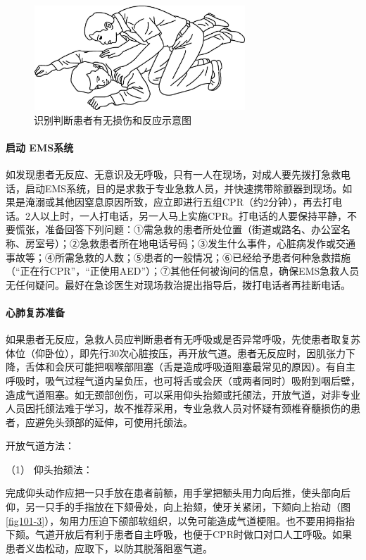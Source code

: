 \begin{figure}[!htbp]
 \centering
 \includegraphics[width=3.13542in,height=1.54167in]{./images/Image00405.jpg}
 \captionsetup{justification=centering}
 \caption{识别判断患者有无损伤和反应示意图}
 \label{fig101-2}
  \end{figure} 

\paragraph{启动 EMS系统}

如发现患者无反应、无意识及无呼吸，只有一人在现场，对成人要先拨打急救电话，启动EMS系统，目的是求救于专业急救人员，并快速携带除颤器到现场。如果是淹溺或其他因窒息原因所致，应立即进行五组CPR（约2分钟），再去打电话。2人以上时，一人打电话，另一人马上实施CPR。打电话的人要保持平静，不要慌张，准备回答下列问题：①需急救的患者所处位置（街道或路名、办公室名称、房室号）；②急救患者所在地电话号码；③发生什么事件，心脏病发作或交通事故等；④所需急救的人数；⑤患者的一般情况；⑥已经给予患者何种急救措施（“正在行CPR”，“正使用AED”）；⑦其他任何被询问的信息，确保EMS急救人员无任何疑问。最好在急诊医生对现场救治提出指导后，拨打电话者再挂断电话。

\paragraph{心肺复苏准备}

如果患者无反应，急救人员应判断患者有无呼吸或是否异常呼吸，先使患者取复苏体位（仰卧位），即先行30次心脏按压，再开放气道。患者无反应时，因肌张力下降，舌体和会厌可能把咽喉部阻塞（舌是造成呼吸道阻塞最常见的原因）。有自主呼吸时，吸气过程气道内呈负压，也可将舌或会厌（或两者同时）吸附到咽后壁，造成气道阻塞。如无颈部创伤，可以采用仰头抬颏或托颌法，开放气道，对非专业人员因托颌法难于学习，故不推荐采用，专业急救人员对怀疑有颈椎脊髓损伤的患者，应避免头颈部的延伸，可使用托颌法。

开放气道方法：

\hypertarget{text00283.htmlux5cux23CHP10-1-4-2-3-1}{}
（1） 仰头抬颏法：

完成仰头动作应把一只手放在患者前额，用手掌把额头用力向后推，使头部向后仰，另一只手的手指放在下颏骨处，向上抬颏，使牙关紧闭，下颏向上抬动（图\ref{fig101-3}），匆用力压迫下颌部软组织，以免可能造成气道梗阻。也不要用拇指抬下颏。气道开放后有利于患者自主呼吸，也便于CPR时做口对口人工呼吸。如果患者义齿松动，应取下，以防其脱落阻塞气道。

